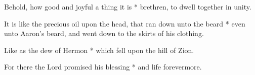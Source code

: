 \begin{multicols}{2}
	
	Behold, how good and joyful a thing it is * brethren, to dwell together in unity.
	
	It is like the precious oil upon the head, that ran down unto the beard * even unto Aaron's beard, and went down to the skirts of his clothing.
	
	Like as the dew of Hermon * which fell upon the hill of Zion.
	
	For there the Lord promised his blessing * and life forevermore.
	
	\gloria{}
\end{multicols}